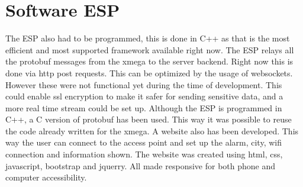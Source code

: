 \section{Software ESP}
\label{sec:esp}
The ESP also had to be programmed, this is done in C++ as that is the most efficient and most supported framework available right now. The ESP relays all the protobuf messages from the xmega to the server backend. Right now this is done via http post requests. This can be optimized by the usage of websockets. However these were not functional yet during the time of development. This could enable ssl encryption to make it safer for sending sensitive data, and a more real time stream could be set up. Although the ESP is programmed in C++, a C version of protobuf has been used. This way it was possible to reuse the code already written for the xmega. A website also has been developed. This way the user can connect to the access point and set up the alarm, city, wifi connection and information shown. The website was created using html, css, javascript, bootstrap and jquerry. All made responsive for both phone and computer accessibility.
